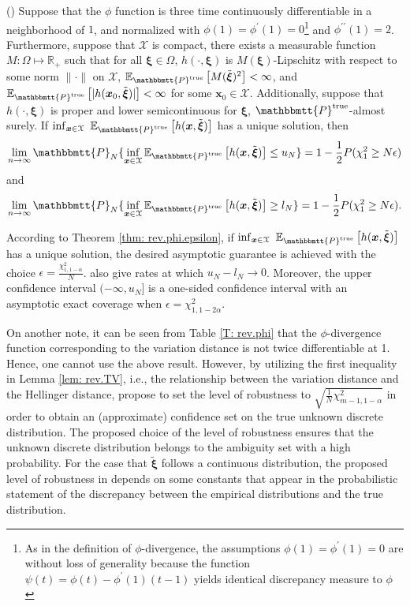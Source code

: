 \documentclass[final,onefignum,onetabnum]{class}
\newcommand{\ee}[2]{\mathbb{E}_{#1} \left[ #2 \right]}
\newcommand{\bs}[1]{\boldsymbol{#1}} %
\newcommand{\Bs}[1]{\mathbb{#1}} %
\newcommand{\Ts}[1]{\mathbbmtt{#1}} %
\newcommand{\Cs}[1]{\mathcal{#1}} %
\newcommand{\txi}{\tilde{\bs{\xi}}}
\newcommand{\trueP}{\Ts{P}^{\text{true}}}
\begin{document}
\begin{theorem}{(\citet[Theorem~4]{duchi2016})}
    \label{thm: rev.phi.epsilon}
    Suppose that the $\phi$ function is three time continuously differentiable in a neighborhood of $1$, and normalized with $\phi(1)=\phi^{\prime}(1)=0$\footnote{As in the definition of $\phi$-divergence, the assumptions $\phi(1)=\phi^{\prime}(1)=0$ are without loss of generality because the function $\psi(t)= \phi(t)- \phi^{\prime}(1) (t-1)$ yields  identical discrepancy measure to $\phi$ \cite{pardo2005}} and  $\phi^{\prime\prime}(1)=2$. 
    Furthermore, suppose that $\Cs{X}$ is compact, there exists a measurable function $M: \Omega \mapsto \Bs{R}_{+}$ such that for all $\bs{\xi} \in \Omega$, $h(\cdot, \bs{\xi})$ is $M(\bs{\xi})$-Lipschitz with respect to some norm $\|\cdot\|$ on $\Cs{X}$,  $\ee{\trueP}{M(\txi)^{2}}< \infty$, and $\ee{\trueP}{|h(\bs{x}_{0}, \txi)|}<\infty$ for some  $\bs{x}_{0} \in \Cs{X}$. Additionally, suppose that $h(\cdot, \bs{\xi})$ is proper and lower semicontinuous for $\bs{\xi}$, $\trueP$-almost surely. %
    If $\inf_{\bs{x} \in \Cs{X}} \ \ee{\trueP}{h(\bs{x},\txi)} $ has a unique solution, then
    $$\lim_{n \rightarrow \infty} \Ts{P}_{N}\{\inf_{\bs{x} \in \Cs{X}} \ee{\trueP}{h(\bs{x},\txi)} \le u_{N} \}= 1- \frac{1}{2} P(\chi^{2}_{1} \ge N \epsilon)$$
    and
    $$\lim_{n \rightarrow \infty} \Ts{P}_{N}\{\inf_{\bs{x} \in \Cs{X}} \ee{\trueP}{h(\bs{x},\txi)} \ge l_{N} \}= 1- \frac{1}{2} P(\chi^{2}_{1} \ge N \epsilon).$$
\end{theorem}
According to Theorem \ref{thm: rev.phi.epsilon}, if  $\inf_{\bs{x} \in \Cs{X}} \ \ee{\trueP}{h(\bs{x},\txi)} $ has a unique solution, the desired asymptotic guarantee is achieved  with the choice $\epsilon=\frac{\chi^{2}_{1, 1-\alpha}}{N}$. 
\citet{duchi2016} also give rates at which $u_{N} - l_{N} \rightarrow 0$. 
Moreover, the upper confidence interval $(-\infty, u_N]$ is a one-sided confidence interval with an asymptotic exact coverage when $\epsilon=\chi^{2}_{1, 1-2\alpha}$.  

On another note, it can be seen from Table \ref{T: rev.phi} that the $\phi$-divergence function corresponding to the variation distance is not twice differentiable at 1. Hence, one cannot use the above result. However, by utilizing the first inequality in Lemma \ref{lem: rev.TV}, i.e., the relationship between the variation distance and the Hellinger distance, \citet{jiang2018} propose to set the level of robustness to $\sqrt{\frac{1}{N}\chi^{2}_{m-1, 1-\alpha}}$ in order to obtain  an (approximate) confidence
set on the true unknown discrete distribution. The proposed choice of the level of robustness ensures that the unknown discrete distribution belongs to the ambiguity set with a high probability.  For the case that $\txi$ follows a  continuous distribution, the proposed level of robustness in \cite{jiang2018} depends on some constants that appear in the probabilistic statement of the discrepancy between the empirical distributions and the true distribution.  
\end{document}
